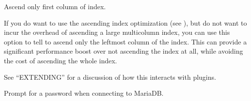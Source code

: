 \documentclass[letterpaper,10pt,english]{sphinxmanual}
\begin{document}

\begin{fulllineitems}
\label{\detokenize{mariadb-archiver:cmdoption-mariadb-archiver-ascend-first}}
Ascend only first column of index.

If you do want to use the ascending index optimization (see {\hyperref[\detokenize{mariadb-archiver:cmdoption-mariadb-archiver-no-ascend}]{}}),
but do not want to incur the overhead of ascending a large multi\sphinxhyphen{}column index,
you can use this option to tell  to ascend only the leftmost column
of the index.  This can provide a significant performance boost over not
ascending the index at all, while avoiding the cost of ascending the whole
index.

See “EXTENDING” for a discussion of how this interacts with plugins.

\end{fulllineitems}


\begin{fulllineitems}
\label{\detokenize{mariadb-archiver:cmdoption-mariadb-archiver-ask-pass}}
Prompt for a password when connecting to MariaDB.

\end{fulllineitems}
\end{document}
